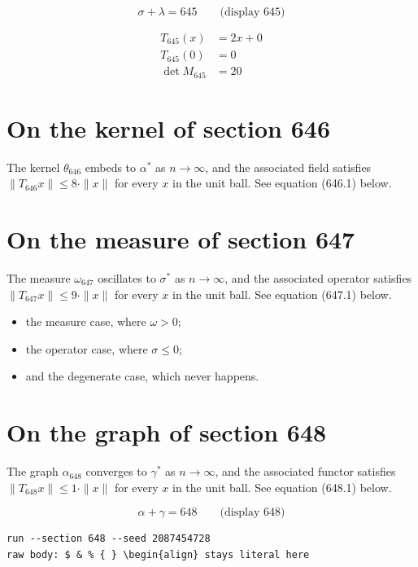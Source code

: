 \documentclass{article}
\begin{document}
$$
\sigma + \lambda = 645 \qquad \text{(display 645)}
$$

\begin{align}
T_{645}(x) &= 2 x + 0 \\
T_{645}(0) &= 0 \\
\det M_{645} &= 20
\end{align}

\section{On the kernel of section 646}
The kernel $\theta_{646}$ embeds to $\alpha^{*}$ as $n \to \infty$,
and the associated field satisfies $\|T_{646} x\| \leq 8 \cdot \|x\|$
for every $x$ in the unit ball. See equation (646.1) below.

\section{On the measure of section 647}
The measure $\omega_{647}$ oscillates to $\sigma^{*}$ as $n \to \infty$,
and the associated operator satisfies $\|T_{647} x\| \leq 9 \cdot \|x\|$
for every $x$ in the unit ball. See equation (647.1) below.

\begin{itemize}
  \item the measure case, where $\omega > 0$;
  \item the operator case, where $\sigma \leq 0$;
  \item and the degenerate case, which never happens.
\end{itemize}

\section{On the graph of section 648}
The graph $\alpha_{648}$ converges to $\gamma^{*}$ as $n \to \infty$,
and the associated functor satisfies $\|T_{648} x\| \leq 1 \cdot \|x\|$
for every $x$ in the unit ball. See equation (648.1) below.

$$
\alpha + \gamma = 648 \qquad \text{(display 648)}
$$

\begin{verbatim}
run --section 648 --seed 2087454728
raw body: $ & % { } \begin{align} stays literal here
\end{verbatim}
\end{document}
